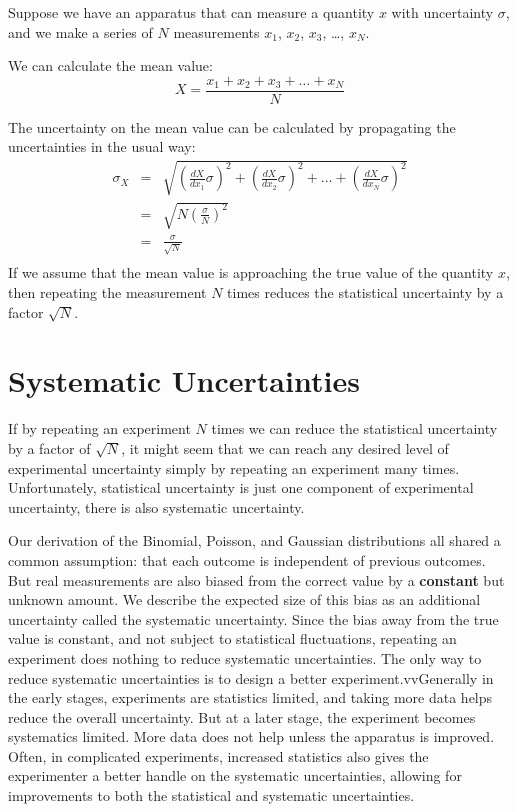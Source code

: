 \documentclass[12pt,oneside]{book}
\begin{document}
Suppose we have an apparatus that can measure a quantity $x$ with uncertainty $\sigma$, and we make a series of $N$ measurements $x_1$, $x_2$, $x_3$, \ldots, $x_N$.

We can calculate the mean value:
\begin{displaymath}
X = \frac{x_1 + x_2 + x_3 + \ldots + x_N}{N}
\end{displaymath}

The uncertainty on the mean value can be calculated by propagating the uncertainties in the usual way:
\begin{eqnarray*}
\sigma_X &=& \sqrt{\left(\frac{dX}{dx_1} \sigma \right)^2 
+ \left(\frac{dX}{dx_2} \sigma \right)^2 +  \ldots + \left(\frac{dX}{dx_N} \sigma \right)^2 } \\
&=& \sqrt{N \left(\frac{\sigma}{N} \right)^2}\\ 
&=& \frac{\sigma}{\sqrt{N}} \\
\end{eqnarray*}
If we assume that the mean value is approaching the true value of the quantity $x$, then repeating the measurement $N$ times reduces the statistical uncertainty by a factor $\sqrt{N}$.

\section{Systematic Uncertainties}

If by repeating an experiment $N$ times we can reduce the statistical uncertainty by a factor of $\sqrt{N}$, it might seem that we can reach any desired level of experimental uncertainty simply by repeating an experiment many times.  Unfortunately, statistical uncertainty is just one component of experimental uncertainty, there is also systematic uncertainty.

Our derivation of the Binomial, Poisson, and Gaussian distributions all shared a common assumption:  that each outcome is independent of previous outcomes.  But real measurements are also biased from the correct value by a  {\bf constant} but unknown amount.  We describe the expected size of this bias as an additional uncertainty called the systematic uncertainty.  Since the bias away from the true value is constant, and not subject to statistical fluctuations, repeating an experiment does nothing to reduce systematic uncertainties.  The only way to reduce systematic uncertainties is to design a better experiment.vvGenerally in the early stages, experiments are statistics limited, and taking more data helps reduce the overall uncertainty.  But at a later stage, the experiment becomes systematics limited.  More data does not help unless the apparatus is improved.  Often, in complicated experiments, increased statistics also gives the experimenter a better handle on the systematic uncertainties, allowing for improvements to both the statistical and systematic uncertainties.
\end{document}
